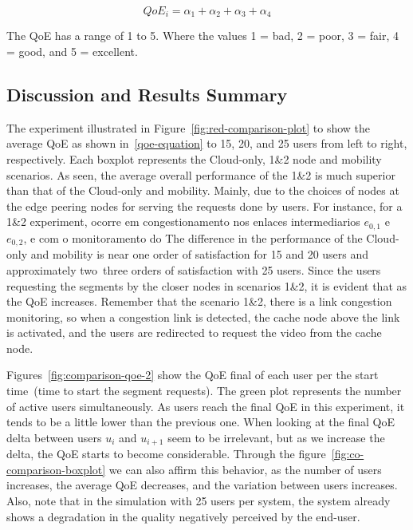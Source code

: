 \begin{equation}\label{eq:qoe-equation}
QoE_i = \alpha_1 + \alpha_2 + \alpha_3 + \alpha_4
\end{equation}

The QoE has a range of 1 to 5. Where the values 1 = bad, 2 = poor, 3 = fair, 4 = good, and 5 = excellent.



\subsection{Discussion and Results Summary}


The experiment illustrated in Figure~\ref{fig:red-comparison-plot} to show the average QoE as shown in~\ref{qoe-equation} to 15, 20, and 25 users from left to right, respectively. Each boxplot represents the Cloud-only, 1\&2 node and mobility scenarios. As seen, the average overall performance of the 1\&2 is much superior than that of the Cloud-only and mobility. Mainly, due to the choices of nodes at the edge peering nodes for serving the requests done by users. 
%
For instance, for a 1\&2 experiment, ocorre em congestionamento nos enlaces intermediarios $e_{0,1}$ e $e_{0,2}$, e com o monitoramento do 
%
The difference in the performance of the Cloud-only and mobility is near one order of satisfaction for 15 and 20 users and approximately two~three orders of satisfaction with 25 users. 
%
Since the users requesting the segments by the closer nodes in scenarios 1\&2, it is
evident that as the QoE increases. Remember that the scenario 1\&2, there is a link congestion monitoring, so when a congestion link is detected, the cache node above the link is activated, and the users are redirected to request the video from the cache node.

Figures~\ref{fig:comparison-qoe-2} show the QoE final of each user per the start time~(time to start the segment requests). The green plot represents the number of active users simultaneously.  
As users reach the final QoE in this experiment, it tends to be a little lower than the previous one. When looking at the final QoE delta between users $u_{i}$ and $u_{i + 1}$ seem to be irrelevant, but as we increase the delta, the QoE starts to become considerable. Through the figure~\ref{fig:co-comparison-boxplot} we can also affirm this behavior, as the number of users increases, the average QoE decreases, and the variation between users increases. Also, note that in the simulation with 25 users per system, the system already shows a degradation in the quality negatively perceived by the end-user.

